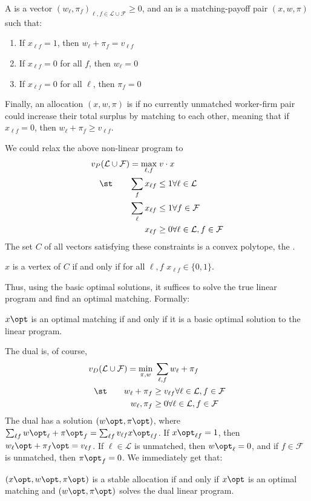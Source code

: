 \documentclass[10pt]{article}
\begin{document}
\begin{model}
	A  is a vector $(w_\ell,\pi_f)_{\ell,f \in \mathcal{L} \cup \mathcal{F}} \ge 0$, and an  is a matching-payoff pair $(x,w,\pi)$ such that:
	\begin{enumerate}
		\item If $x_{\ell f} = 1$, then $w_\ell + \pi_f = v_{\ell f}$
		\item If $x_{\ell f} = 0$ for all $f$, then $w_\ell = 0$
		\item If $x_{\ell f} = 0$ for all $\ell$, then $\pi_f = 0$
	\end{enumerate}
	Finally, an allocation $(x,w,\pi)$ is  if no currently unmatched worker-firm pair could increase their total surplus by matching to each other, meaning that if $x_{\ell f} = 0$, then $w_\ell + \pi_f \ge v_{\ell f}$.
	
	We could relax the above non-linear program to 
	\begin{align*}
		v_P(\mathcal{L} \cup \mathcal{F}) = \max_{\ell,f} &\; v \cdot x \\ \st \qquad \sum_f x_{\ell f} &\le 1 \forall \ell \in \mathcal{L}\\\sum_\ell x_{\ell f} &\le 1 \forall f \in \mathcal{F} \\ x_{\ell f} &\ge 0 \forall \ell \in \mathcal{L},f \in \mathcal{F}
	\end{align*}
	The set $C$ of all vectors satisfying these constraints is a convex polytope, the .
	
	\begin{theorem}
		 $x$ is a vertex of $C$ if and only if for all $\ell,f$ $x_{\ell f} \in \{0,1\}$.
	\end{theorem}
	Thus, using the basic optimal solutions, it suffices to solve the true linear program and find an optimal matching. Formally:
	\begin{corollary}
		$x\opt$ is an optimal matching if and only if it is a basic optimal solution to the linear program.
	\end{corollary}
	The dual is, of course,
	\begin{align*}
		v_D(\mathcal{L} \cup \mathcal{F}) = \min_{\pi,w} &\; \sum_{\ell,f} w_\ell + \pi_f \\ \st\qquad w_\ell + \pi_f &\ge v_{\ell f} \forall \ell \in \mathcal{L},f \in \mathcal{F} \\ w_\ell,\pi_f &\ge 0 \forall \ell \in \mathcal{L},f \in \mathcal{F} 
	\end{align*}
	The dual has a solution $(w\opt,\pi\opt)$, where $\sum_{\ell f} w\opt_\ell + \pi\opt_f = \sum_{\ell f} v_{\ell f} x\opt_{\ell f}$. If $x\opt_{\ell f} = 1$, then $w_\ell\opt + \pi_f\opt = v_{\ell f}$. If $\ell \in \mathcal{L}$ is unmatched, then $w\opt_\ell = 0$, and if $f \in \mathcal{F}$ is unmatched, then $\pi\opt_f = 0$. We immediately get that:
	\begin{theorem}
		$(x\opt,w\opt,\pi\opt)$ is a stable allocation if and only if $x\opt$ is an optimal matching and $(w\opt,\pi\opt)$ solves the dual linear program.
	\end{theorem} 
\end{model}
\end{document}
